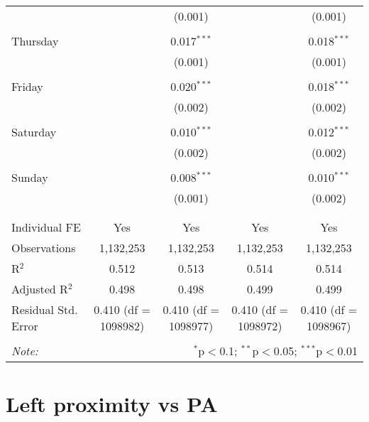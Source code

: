 \documentclass[
]{article}
\begin{document}
\begin{table}[!htbp]
{\begin{tabular}{@{\extracolsep{5pt}}lcccc}
  &  & (0.001) &  & (0.001) \\ 
  & & & & \\ 
 Thursday &  & 0.017$^{***}$ &  & 0.018$^{***}$ \\ 
  &  & (0.001) &  & (0.001) \\ 
  & & & & \\ 
 Friday &  & 0.020$^{***}$ &  & 0.018$^{***}$ \\ 
  &  & (0.002) &  & (0.002) \\ 
  & & & & \\ 
 Saturday &  & 0.010$^{***}$ &  & 0.012$^{***}$ \\ 
  &  & (0.002) &  & (0.002) \\ 
  & & & & \\ 
 Sunday &  & 0.008$^{***}$ &  & 0.010$^{***}$ \\ 
  &  & (0.001) &  & (0.002) \\ 
  & & & & \\ 
\hline \\[-1.8ex] 
Individual FE & Yes & Yes & Yes & Yes \\ 
Observations & 1,132,253 & 1,132,253 & 1,132,253 & 1,132,253 \\ 
R$^{2}$ & 0.512 & 0.513 & 0.514 & 0.514 \\ 
Adjusted R$^{2}$ & 0.498 & 0.498 & 0.499 & 0.499 \\ 
Residual Std. Error & 0.410 (df = 1098982) & 0.410 (df = 1098977) & 0.410 (df = 1098972) & 0.410 (df = 1098967) \\ 
\hline 
\hline \\[-1.8ex] 
\textit{Note:}  & \multicolumn{4}{r}{$^{*}$p$<$0.1; $^{**}$p$<$0.05; $^{***}$p$<$0.01} \\ 
\end{tabular}
} 
\end{table} 
\newpage
\section{Left proximity vs PA}
\end{document}
